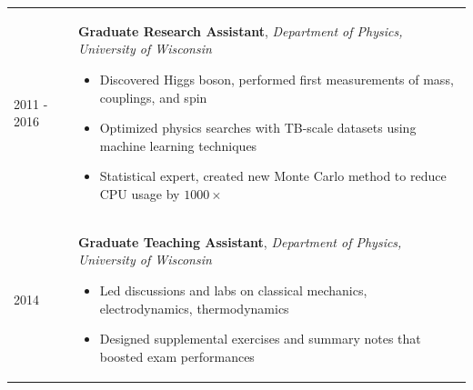 \documentclass{letter}
\begin{document}
\begin{tabular}{p{}p{}}
  2011 - 2016
  &
  \textbf{Graduate Research Assistant}, \textit{Department of Physics, University of Wisconsin} \newline
  \vspace{-15pt}  %
  \begin{itemize}
    \itemsep0em
    \renewcommand{\labelitemi}{\tiny$\blacksquare$}
    \item Discovered Higgs boson, performed first measurements of mass, couplings, and spin 
    \item Optimized physics searches with TB-scale datasets using machine learning techniques
    \item Statistical expert, created new Monte Carlo method to reduce CPU usage by $1000\times$
  \end{itemize}
  \\

  2014 
  & 
  \textbf{Graduate Teaching Assistant}, \textit{Department of Physics, University of Wisconsin} \newline
  \vspace{-15pt}  %
  \begin{itemize}
    \itemsep0em
    \renewcommand{\labelitemi}{\tiny$\blacksquare$} 
    \item Led discussions and labs on classical mechanics, electrodynamics, thermodynamics
    \item Designed supplemental exercises and summary notes that boosted exam performances
  \end{itemize}
  \\


\end{tabular}
\end{document}
